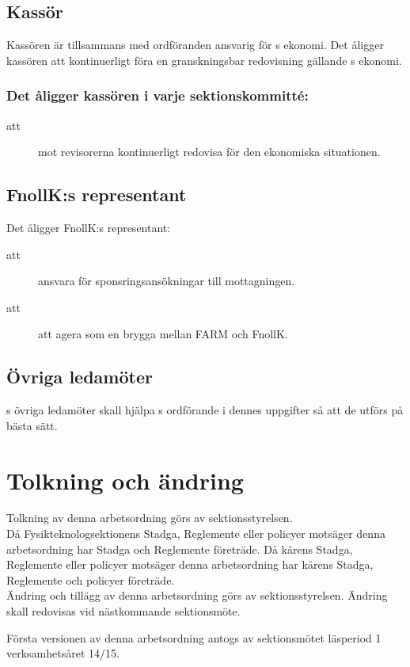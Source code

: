 \subsection{Kassör}
Kassören är tillsammans med ordföranden ansvarig för \forening s ekonomi. Det åligger kassören att kontinuerligt föra en granskningsbar redovisning gällande \forening s ekonomi.\\

\subsubsection{Det åligger kassören i varje sektionskommitté:}
\begin{description}
\item[att] mot revisorerna kontinuerligt redovisa för den ekonomiska situationen.

\end{description}



\subsection{FnollK:s representant}
Det åligger FnollK:s representant:
\begin{description}
\item[att] ansvara för sponsringsansökningar till mottagningen.
\item[att] att agera som en brygga mellan FARM och FnollK.
\end{description}

\subsection{Övriga ledamöter}
\forening s övriga ledamöter skall hjälpa \forening s ordförande i dennes uppgifter så att de utförs på bästa sätt.

\section{Tolkning och ändring}
Tolkning av denna arbetsordning görs av sektionsstyrelsen.\\ Då Fysikteknologsektionens Stadga, Reglemente eller policyer motsäger denna arbetsordning har Stadga och Reglemente företräde. Då kårens Stadga, Reglemente eller policyer motsäger denna arbetsordning har kårens Stadga, Reglemente och policyer företräde.\\
Ändring och tillägg av denna arbetsordning görs av sektionsstyrelsen. Ändring skall redovisas vid nästkommande sektionsmöte. 

Första versionen av denna arbetsordning antogs av sektionsmötet läsperiod 1 verksamhetsåret 14/15.

\newpage
